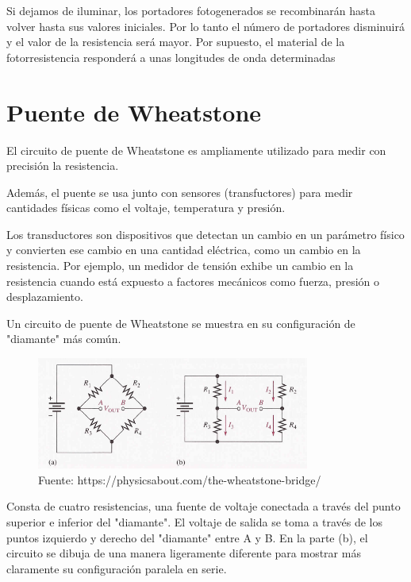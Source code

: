 \documentclass[12pt, fleqn]{article}                            %
\theoremstyle{break}                                            %
\begin{document}
            Si dejamos de iluminar, los portadores
            fotogenerados se recombinarán hasta volver hasta
            sus valores iniciales. Por lo tanto el número de
            portadores disminuirá y el valor de la resistencia
            será mayor. Por supuesto, el material de la
            fotorresistencia responderá a unas longitudes de
            onda determinadas




\section{Puente de Wheatstone}

    El circuito de puente de Wheatstone es ampliamente utilizado para medir con precisión la resistencia. 

    Además, el puente se usa junto con sensores (transfuctores) para medir cantidades físicas como el voltaje,
    temperatura y presión. 

    Los transductores son dispositivos que detectan un cambio en un parámetro físico y convierten ese cambio
    en una cantidad eléctrica, como un cambio en la resistencia. Por ejemplo, un medidor de tensión exhibe
    un cambio en la resistencia cuando está expuesto a factores mecánicos como fuerza, presión o desplazamiento.

    Un circuito de puente de Wheatstone se muestra en su configuración de "diamante" más común.


    \begin{figure}[h]
        \centering
        \includegraphics[width=0.8\textwidth]{Puente}
        \caption{Fuente: https://physicsabout.com/the-wheatstone-bridge/}
    \end{figure}

    Consta de cuatro resistencias, una fuente de voltaje conectada a través del punto superior e inferior del "diamante".
    El voltaje de salida se toma a través de los puntos izquierdo y derecho del "diamante" entre A y B. En la parte (b),
    el circuito se dibuja de una manera ligeramente diferente para mostrar más claramente su configuración paralela en
    serie.
\end{document}
